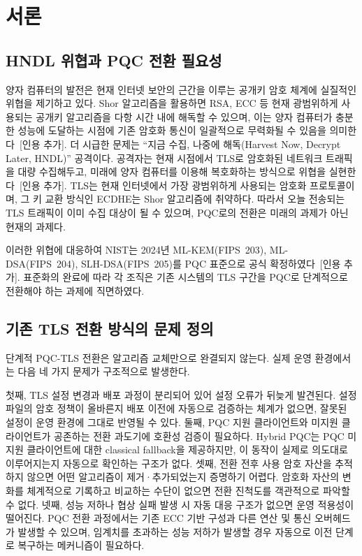 \section{서론}

\subsection{HNDL 위협과 PQC 전환 필요성}

양자 컴퓨터의 발전은 현재 인터넷 보안의 근간을 이루는 공개키 암호 체계에 실질적인 위협을 제기하고 있다.
Shor 알고리즘을 활용하면 RSA, ECC 등 현재 광범위하게 사용되는 공개키 알고리즘을 다항 시간 내에 해독할 수 있으며, 이는 양자 컴퓨터가 충분한 성능에 도달하는 시점에 기존 암호화 통신이 일괄적으로 무력화될 수 있음을 의미한다~[인용 추가].
더 시급한 문제는 ``지금 수집, 나중에 해독(Harvest Now, Decrypt Later, HNDL)'' 공격이다.
공격자는 현재 시점에서 TLS로 암호화된 네트워크 트래픽을 대량 수집해두고, 미래에 양자 컴퓨터를 이용해 복호화하는 방식으로 위협을 실현한다~[인용 추가].
TLS는 현재 인터넷에서 가장 광범위하게 사용되는 암호화 프로토콜이며, 그 키 교환 방식인 ECDHE는 Shor 알고리즘에 취약하다.
따라서 오늘 전송되는 TLS 트래픽이 이미 수집 대상이 될 수 있으며, PQC로의 전환은 미래의 과제가 아닌 현재의 과제다.

이러한 위협에 대응하여 NIST는 2024년 ML-KEM(FIPS~203), ML-DSA(FIPS~204), SLH-DSA(FIPS~205)를 PQC 표준으로 공식 확정하였다~[인용 추가].
표준화의 완료에 따라 각 조직은 기존 시스템의 TLS 구간을 PQC로 단계적으로 전환해야 하는 과제에 직면하였다.

\subsection{기존 TLS 전환 방식의 문제 정의}

단계적 PQC-TLS 전환은 알고리즘 교체만으로 완결되지 않는다.
실제 운영 환경에서는 다음 네 가지 문제가 구조적으로 발생한다.

첫째, TLS 설정 변경과 배포 과정이 분리되어 있어 설정 오류가 뒤늦게 발견된다.
설정 파일의 암호 정책이 올바른지 배포 이전에 자동으로 검증하는 체계가 없으면, 잘못된 설정이 운영 환경에 그대로 반영될 수 있다.
둘째, PQC 지원 클라이언트와 미지원 클라이언트가 공존하는 전환 과도기에 호환성 검증이 필요하다.
Hybrid PQC는 PQC 미지원 클라이언트에 대한 classical fallback을 제공하지만, 이 동작이 실제로 의도대로 이루어지는지 자동으로 확인하는 구조가 없다.
셋째, 전환 전후 사용 암호 자산을 추적하지 않으면 어떤 알고리즘이 제거·추가되었는지 증명하기 어렵다.
암호화 자산의 변화를 체계적으로 기록하고 비교하는 수단이 없으면 전환 진척도를 객관적으로 파악할 수 없다.
넷째, 성능 저하나 협상 실패 발생 시 자동 대응 구조가 없으면 운영 적용성이 떨어진다.
PQC 전환 과정에서는 기존 ECC 기반 구성과 다른 연산 및 통신 오버헤드가 발생할 수 있으며, 임계치를 초과하는 성능 저하가 발생할 경우 자동으로 이전 단계로 복구하는 메커니즘이 필요하다.

